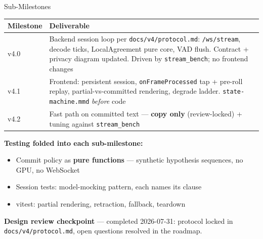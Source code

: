 \documentclass{beamer}
\begin{document}
\begin{frame}{Sub-Milestones}
    \footnotesize
    \begin{table}
    \centering\scriptsize
    \begin{tabular}{@{} l p{7.2cm} @{}}
        \toprule
        \textbf{Milestone} & \textbf{Deliverable} \\
        \midrule
        v4.0 & Backend session loop per \texttt{docs/v4/protocol.md}:
               \texttt{/ws/stream}, decode ticks, LocalAgreement pure core,
               VAD flush. Contract + privacy diagram updated. Driven by
               \texttt{stream\_bench}; no frontend changes \\
        v4.1 & Frontend: persistent session, \texttt{onFrameProcessed} tap +
               pre-roll replay, partial-vs-committed rendering, degrade
               ladder. \texttt{state-machine.mmd} \emph{before} code \\
        v4.2 & Fast path on committed text --- \textbf{copy only}
               (review-locked) + tuning against \texttt{stream\_bench} \\
        \bottomrule
    \end{tabular}
    \end{table}

    \vspace{0.1em}
    \textbf{Testing folded into each sub-milestone:}
    \begin{itemize}\setlength{\itemsep}{0pt}
        \item Commit policy as \textbf{pure functions} --- synthetic hypothesis
              sequences, no GPU, no WebSocket
        \item Session tests: model-mocking pattern, each names its clause
        \item vitest: partial rendering, retraction, fallback, teardown
    \end{itemize}

    \vspace{0.1em}
    \textbf{Design review checkpoint} --- completed 2026-07-31: protocol locked
    in \texttt{docs/v4/protocol.md}, open questions resolved in the roadmap.
\end{frame}
\end{document}
